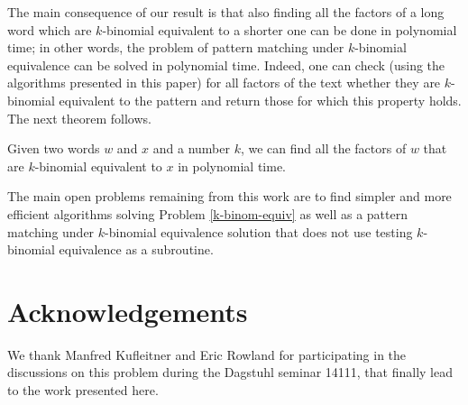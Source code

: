 \documentclass[runningheads]{llncs}
\begin{document}
The main consequence of our result is that also finding all the factors of a long word which are $k$-binomial equivalent to a shorter one can be done in polynomial time; in other words, the problem of pattern matching under $k$-binomial equivalence can be solved in polynomial time. Indeed, one can check (using the algorithms presented in this paper) for all factors of the text whether they are $k$-binomial equivalent to the pattern and return those for which this property holds. The next theorem follows.
\begin{theorem}
Given two words $w$ and $x$ and a number $k$, we can find all the factors of $w$ that are $k$-binomial equivalent to $x$ in polynomial time.
\end{theorem}

The main open problems remaining from this work are to find simpler and more efficient algorithms solving Problem \ref{k-binom-equiv} as well as a pattern matching under $k$-binomial equivalence solution that does not use testing $k$-binomial equivalence as a subroutine. 


\section*{Acknowledgements}
We thank Manfred Kufleitner and Eric Rowland for participating in the discussions on this problem during the Dagstuhl seminar 14111, that finally lead to the work presented here.



\end{document}
